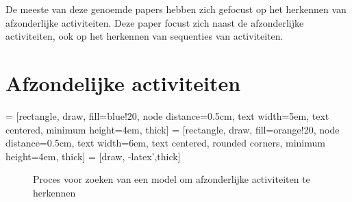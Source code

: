 \documentclass{article}
\begin{document}
De meeste van deze genoemde papers hebben zich gefocust op het herkennen van afzonderlijke activiteiten. Deze paper focust zich naast de afzonderlijke activiteiten, ook op het herkennen van sequenties van activiteiten.




\section{Afzondelijke activiteiten}
\label{afzonderlijk}

 = [rectangle, draw, fill=blue!20, node distance=0.5cm, text width=5em, text centered, minimum height=4em, thick]
 = [rectangle, draw, fill=orange!20, node distance=0.5cm, text width=6em, text centered, rounded corners, minimum height=4em, thick]
 = [draw, -latex',thick]
\begin{figure}
\begin{center}
\end{center}
\caption{Proces voor zoeken van een model om afzonderlijke activiteiten te herkennen}
\label{fig:proces:afzonderlijk}
\end{figure}
\end{document}
